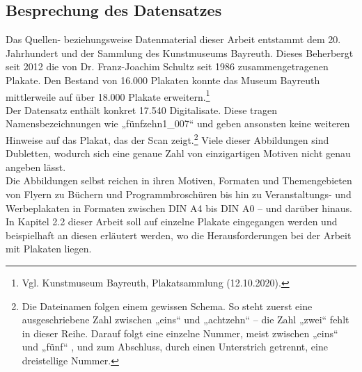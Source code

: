 \documentclass[a4paper,12pt,ngerman]{article}
\begin{document}
\subsection{Besprechung des Datensatzes}
Das Quellen- beziehungsweise Datenmaterial dieser Arbeit entstammt dem 20. Jahrhundert und der Sammlung des Kunstmuseums Bayreuth. Dieses Beherbergt seit 2012 die von Dr. Franz-Joachim Schultz seit 1986 zusammengetragenen Plakate. Den Bestand von 16.000 Plakaten konnte das Museum Bayreuth mittlerweile auf über 18.000 Plakate erweitern.\footnote{Vgl. Kunstmuseum Bayreuth, Plakatsammlung (12.10.2020).} \\
Der Datensatz enthält konkret 17.540 Digitalisate. Diese tragen Namensbezeichnungen wie „fünfzehn1\_007“ und geben ansonsten keine weiteren Hinweise auf das Plakat, das der Scan zeigt.\footnote{Die Dateinamen folgen einem gewissen Schema. So steht zuerst eine ausgeschriebene Zahl zwischen „eins“ und „achtzehn“ -- die Zahl „zwei“ fehlt in dieser Reihe. Darauf folgt eine einzelne Nummer, meist zwischen „eins“ und „fünf“ , und zum Abschluss, durch einen Unterstrich getrennt, eine dreistellige Nummer.} Viele dieser Abbildungen sind Dubletten, wodurch sich eine genaue Zahl von einzigartigen Motiven nicht genau angeben lässt. \\
Die Abbildungen selbst reichen in ihren Motiven, Formaten und Themengebieten von Flyern zu Büchern und Programmbroschüren bis hin zu Veranstaltungs- und Werbeplakaten in Formaten zwischen DIN A4 bis DIN A0 -- und darüber hinaus. In Kapitel 2.2 dieser Arbeit soll auf einzelne Plakate eingegangen werden und beispielhaft an diesen erläutert werden, wo die Herausforderungen bei der Arbeit mit Plakaten liegen. \\
\end{document}
